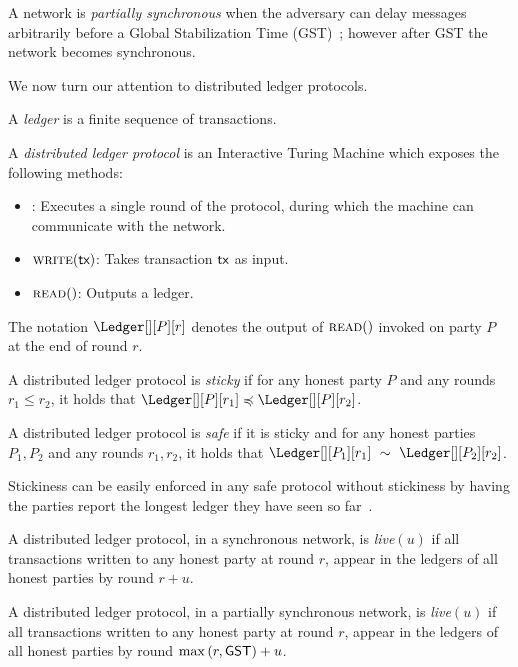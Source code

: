 \begin{definition}
  A network is \emph{partially synchronous} when the adversary can delay
  messages arbitrarily before a Global Stabilization Time (GST)~\cite{dwork1988consensus}; however
  after GST the network becomes synchronous.
\end{definition}

We now turn our attention to distributed ledger protocols.

\begin{definition}[Ledger]
  A \emph{ledger} is a finite sequence of transactions.
\end{definition}

\begin{definition}
  A \emph{distributed ledger protocol} is an
  Interactive Turing Machine which exposes the following
  methods:
  \begin{itemize}
    \item \execute: Executes a single round of the protocol, during
      which the machine can communicate with the network.
    \item $\textsc{write}(\textsf{tx})$: Takes transaction $\textsf{tx}$ as input.
    \item $\textsc{read}()$: Outputs a ledger.
  \end{itemize}
\end{definition}

The notation
$\Ledger[][P][r]$ denotes the output of $\textsc{read}()$
invoked on party $P$ at the end of round $r$.

\begin{definition}[Stickiness]
  A distributed ledger protocol is \emph{sticky} if
  for any honest party $P$ and any rounds $r_1 \leq r_2$,
  it holds that $\Ledger[][P][r_1] \preccurlyeq \Ledger[][P][r_2]$.
\end{definition}

\begin{definition}[Safety]
  A distributed ledger protocol is \emph{safe} if it is sticky and
  for any honest parties $P_1, P_2$ and any rounds $r_1, r_2$, it holds that
  $\Ledger[][P_1][r_1]~\sim~\Ledger[][P_2][r_2]$.
\end{definition}

Stickiness can be easily enforced in any safe protocol
without stickiness by having the parties report the longest
ledger they have seen so far~\cite{streamlet}.

\begin{definition}
  A distributed ledger protocol, in a synchronous network, is \emph{live}$(u)$ if
  all transactions written to any honest party
  at round $r$, appear in the ledgers of all honest parties by round
  $r + u$.
\end{definition}

\begin{definition}
  A distributed ledger protocol, in a partially synchronous network,
  is \emph{live}$(u)$ if all transactions written to any honest party
  at round $r$, appear in the ledgers of all honest parties by round
  $\max{(r,\textsf{GST})} + u$.
\end{definition}


